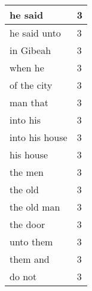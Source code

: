 \begin{center}
\begin{longtable}{|p{3.0in}|p{0.5in}|}
he said & 3\\ \hline 
he said unto & 3\\ \hline 
in Gibeah & 3\\ \hline 
when he & 3\\ \hline 
of the city & 3\\ \hline 
man that & 3\\ \hline 
into his & 3\\ \hline 
into his house & 3\\ \hline 
his house & 3\\ \hline 
the men & 3\\ \hline 
the old & 3\\ \hline 
the old man & 3\\ \hline 
the door & 3\\ \hline 
unto them & 3\\ \hline 
them and & 3\\ \hline 
do not & 3\\ \hline 
\end{longtable}
\end{center}





